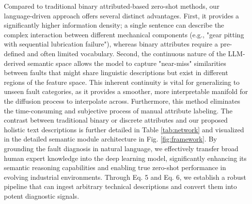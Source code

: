Compared to traditional binary attributed-based zero-shot methods, our language-driven approach offers several distinct advantages. First, it provides a significantly higher information density; a single sentence can describe the complex interaction between different mechanical components (e.g., "gear pitting with sequential lubrication failure"), whereas binary attributes require a pre-defined and often limited vocabulary. Second, the continuous nature of the LLM-derived semantic space allows the model to capture "near-miss" similarities between faults that might share linguistic descriptions but exist in different regions of the feature space. This inherent continuity is vital for generalizing to unseen fault categories, as it provides a smoother, more interpretable manifold for the diffusion process to interpolate across. Furthermore, this method eliminates the time-consuming and subjective process of manual attribute labeling. The contrast between traditional binary or discrete attributes and our proposed holistic text descriptions is further detailed in Table \ref{tab:network} and visualized in the detailed semantic module architecture in Fig. \ref{fig:framework}. By grounding the fault diagnosis in natural language, we effectively transfer broad human expert knowledge into the deep learning model, significantly enhancing its semantic reasoning capabilities and enabling true zero-shot performance in evolving industrial environments. Through Eq. 5 and Eq. 6, we establish a robust pipeline that can ingest arbitrary technical descriptions and convert them into potent diagnostic signals.
